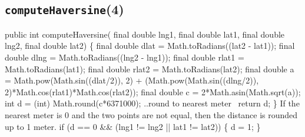 \subsection{{\tt{}\protect{}computeHaversine}(4)}
\nwenddocs{}\endmoddef{}
public int computeHaversine(
    final double lng1, final double lat1, final double lng2, final double lat2) \{
  final double  dlat = Math.toRadians((lat2 - lat1));
  final double  dlng = Math.toRadians((lng2 - lng1));
  final double rlat1 = Math.toRadians(lat1);
  final double rlat2 = Math.toRadians(lat2);
  final double a = Math.pow(Math.sin((dlat/2)), 2)
    + (Math.pow(Math.sin((dlng/2)), 2)*Math.cos(rlat1)*Math.cos(rlat2));
  final double c = 2*Math.asin(Math.sqrt(a));
  int d = (int) Math.round(c*6371000);
  \LA{}..round to nearest meter~{\nwtagstyle{}}\RA{}
  return d;
\}
\eatline
{}\nwendcode{}If the nearest meter is 0 and the two points are not equal, then the distance
is rounded up to 1 meter.
\nwenddocs{}\endmoddef{}
if (d == 0 && (lng1 != lng2 || lat1 != lat2)) \{
  d = 1;
\}
\nwendcode{}\nwdocspar

